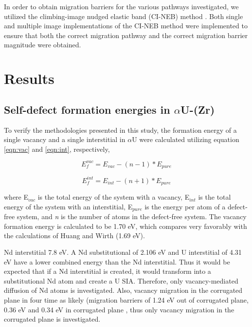 \documentclass[review]{elsarticle}
\begin{document}
In order to obtain migration barriers for the various pathways investigated, we utilized the climbing-image nudged elastic band (CI-NEB) method \cite{neb1}.  Both single and multiple image implementations of the CI-NEB method were implemented to ensure that both the correct migration pathway and the correct migration barrier magnitude were obtained. 

\section{Results}

\subsection{Self-defect formation energies in $\alpha$U-(Zr)}

To verify the methodologies presented in this study, the formation energy of a single vacancy and a single interstitial in $\alpha$U were calculated utilizing equation \ref{eqn:vac} and \ref{eqn:int}, respectively,

\begin{equation}
\label{eqn:vac}
E_{f}^{vac} = E_{vac} - (n-1)*E_{pure}
\end{equation} 

\begin{equation}
\label{eqn:int}
E_{f}^{int} = E_{int} - (n+1)*E_{pure}
\end{equation} 

where E$_{vac}$ is the total energy of the system with a vacancy, E$_{int}$ is the total energy of the system with an interstitial, E$_{pure}$ is the energy per atom of a defect-free system, and \textit{n} is the number of atoms in the defect-free system. The vacancy formation energy is calculated to be 1.70 eV, which compares very favorably with the calculations of Huang and Wirth \cite{wirth2011} (1.69 eV).  

Nd interstitial 7.8 eV.  A Nd substitutional of 2.106 eV and U interstitial of 4.31 eV \cite{wirth2012} have a lower combined energy than the Nd interstitial.  Thus it would be expected that if a Nd interstitial is created, it would transform into a substitutional Nd atom and create a U SIA.  Therefore, only vacancy-mediated diffusion of Nd atoms is investigated.  Also, vacancy migration in the corrugated plane in four time as likely (migration barriers of 1.24 eV out of corrugated plane, 0.36 eV and 0.34 eV in corrugated plane \cite{wirth2011}, thus only vacancy migration in the corrugated plane is investigated.  
\end{document}
